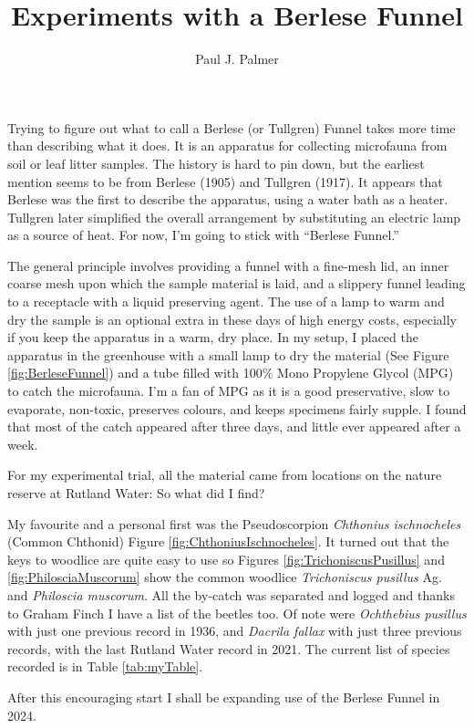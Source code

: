 \documentclass[
]{article}
\title{Experiments with a Berlese Funnel}
\author{Paul J. Palmer}
\date{}
\begin{document}
\maketitle

Trying to figure out what to call a Berlese (or Tullgren) Funnel takes more time than describing what it does. It is an apparatus for collecting microfauna from soil or leaf litter samples. The history is hard to pin down, but the earliest mention seems to be from Berlese (1905) and Tullgren (1917). It appears that Berlese was the first to describe the apparatus, using a water bath as a heater. Tullgren later simplified the overall arrangement by substituting an electric lamp as a source of heat. For now, I'm going to stick with ``Berlese Funnel.''

The general principle involves providing a funnel with a fine-mesh lid, an inner coarse mesh upon which the sample material is laid, and a slippery funnel leading to a receptacle with a liquid preserving agent. The use of a lamp to warm and dry the sample is an optional extra in these days of high energy costs, especially if you keep the apparatus in a warm, dry place. In my setup, I placed the apparatus in the greenhouse with a small lamp to dry the material (See Figure \ref{fig:BerleseFunnel}) and a tube filled with 100\% Mono Propylene Glycol (MPG) to catch the microfauna. I'm a fan of MPG as it is a good preservative, slow to evaporate, non-toxic, preserves colours, and keeps specimens fairly supple. I found that most of the catch appeared after three days, and little ever appeared after a week.

For my experimental trial, all the material came from locations on the nature reserve at Rutland Water: So what did I find?

My favourite and a personal first was the Pseudoscorpion \emph{Chthonius ischnocheles} (Common Chthonid) Figure \ref{fig:ChthoniusIschnocheles}. It turned out that the keys to woodlice are quite easy to use so Figures \ref{fig:TrichoniscusPusillus} and \ref{fig:PhilosciaMuscorum} show the common woodlice \textit{Trichoniscus pusillus} Ag. and \textit{Philoscia muscorum}. All the by-catch was separated and logged and thanks to Graham Finch I have a list of the beetles too. Of note were \emph{Ochthebius pusillus} with just one previous record in 1936, and \emph{Dacrila fallax} with just three previous records, with the last Rutland Water record in 2021. The current list of species recorded is in Table \ref{tab:myTable}.

After this encouraging start I shall be expanding use of the Berlese Funnel in 2024.
\end{document}

